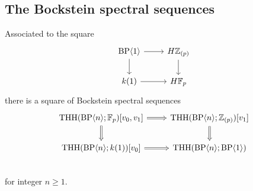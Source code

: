 

\subsection{The Bockstein spectral sequences}

Associated to the square 
\[
\begin{tikzcd}
\BP\langle 1\rangle \ar[r] \ar[d] & H\mathbb{Z}_{(p)} \ar[d] \\ 
k(1) \ar[r] & H\mathbb{F}_p
\end{tikzcd}
\]
there is a square of Bockstein spectral sequences \[
\begin{tikzcd}
\THH(\BP\langle n \rangle ;\mathbb{F}_p)[v_0,v_1]\arrow[Rightarrow]{r} \arrow[Rightarrow]{d} &  \THH(\BP\langle n\rangle ;\mathbb{Z}_{(p)})[v_1]\arrow[Rightarrow]{d}\\ 
\THH(\BP\langle n\rangle ;k(1))[v_0]\arrow[Rightarrow]{r}  &  \THH(\BP\langle n \rangle ;\BP\langle 1\rangle) \\ 
\end{tikzcd}
\]
for integer $n\ge 1$. 

